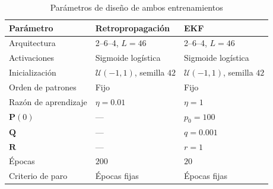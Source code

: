 \documentclass[conference]{IEEEtran}
\begin{document}
\begin{table}[htbp]
\caption{Parámetros de diseño de ambos entrenamientos}
\label{tab:diseno}
\begin{center}
\setlength{\tabcolsep}{4pt}
\begin{tabular}{lll}
\toprule
\textbf{Parámetro} & \textbf{Retropropagación} & \textbf{EKF} \\
\midrule
Arquitectura       & 2--6--4, $L=46$ & 2--6--4, $L=46$ \\
Activaciones       & Sigmoide logística & Sigmoide logística \\
Inicialización     & $\mathcal{U}(-1,1)$, semilla $42$ & $\mathcal{U}(-1,1)$, semilla $42$ \\
Orden de patrones  & Fijo & Fijo \\
Razón de aprendizaje & $\eta=0.01$ & $\eta=1$ \\
$\mathbf{P}(0)$    & --- & $p_0=100$ \\
$\mathbf{Q}$       & --- & $q=0.001$ \\
$\mathbf{R}$       & --- & $r=1$ \\
Épocas             & $200$ & $20$ \\
Criterio de paro   & Épocas fijas & Épocas fijas \\
\bottomrule
\end{tabular}
\end{center}
\end{table}
\end{document}
